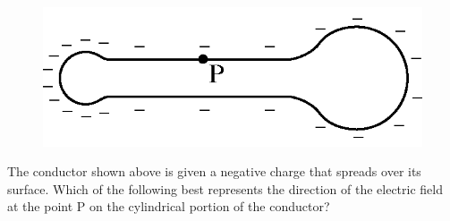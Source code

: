 \begin{figure}[H]
\centering
\includegraphics[scale=0.25]{images/img-008-023.png}
\end{figure}

\begin{questions}\setcounter{question}{14}\question
The conductor shown above is given a negative charge that spreads over its surface. Which of the following best represents the direction of the electric field at the point $\mathrm{P}$ on the cylindrical portion of the conductor?


\end{questions}
